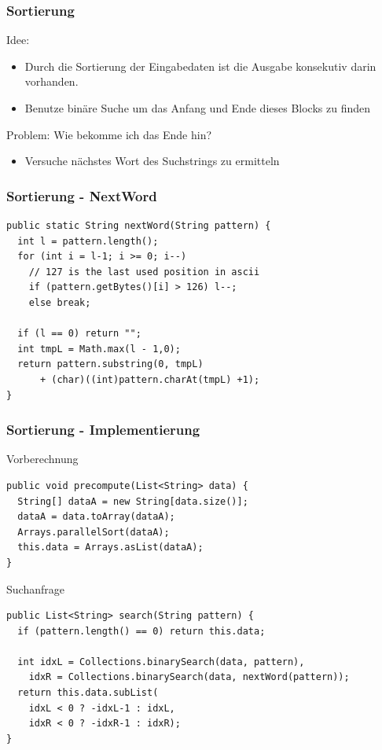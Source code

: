 \documentclass[11pt, xcolor=dvipsnames]{beamer}
\begin{document}
	\begin{frame}
	\frametitle{Sortierung}
	Idee:
	\begin{itemize}
		\item Durch die Sortierung der Eingabedaten ist die Ausgabe konsekutiv darin vorhanden. 
		\item Benutze binäre Suche um das Anfang und Ende dieses Blocks zu finden
	\end{itemize}
	Problem: Wie bekomme ich das Ende hin?
	\begin{itemize}
		\item Versuche nächstes Wort des Suchstrings zu ermitteln
	\end{itemize}	
	\end{frame}
		
\begin{frame}[fragile]
	\frametitle{Sortierung - NextWord}
	\begin{lstlisting}
public static String nextWord(String pattern) {
  int l = pattern.length();	
  for (int i = l-1; i >= 0; i--) 
    // 127 is the last used position in ascii
    if (pattern.getBytes()[i] > 126) l--;
    else break;
    	
  if (l == 0) return "";	
  int tmpL = Math.max(l - 1,0);
  return pattern.substring(0, tmpL) 
	  + (char)((int)pattern.charAt(tmpL) +1);
}	
	\end{lstlisting}
\end{frame}
	
\begin{frame}[fragile]
	\frametitle{Sortierung - Implementierung}
	Vorberechnung
	\begin{lstlisting}
public void precompute(List<String> data) {
  String[] dataA = new String[data.size()];
  dataA = data.toArray(dataA);
  Arrays.parallelSort(dataA);
  this.data = Arrays.asList(dataA);		
}	
	\end{lstlisting}
	Suchanfrage
	\begin{lstlisting}
public List<String> search(String pattern) {
  if (pattern.length() == 0) return this.data;
	
  int idxL = Collections.binarySearch(data, pattern),
    idxR = Collections.binarySearch(data, nextWord(pattern));
  return this.data.subList(
	idxL < 0 ? -idxL-1 : idxL, 
	idxR < 0 ? -idxR-1 : idxR);
}
	\end{lstlisting}
\end{frame}
\end{document}
